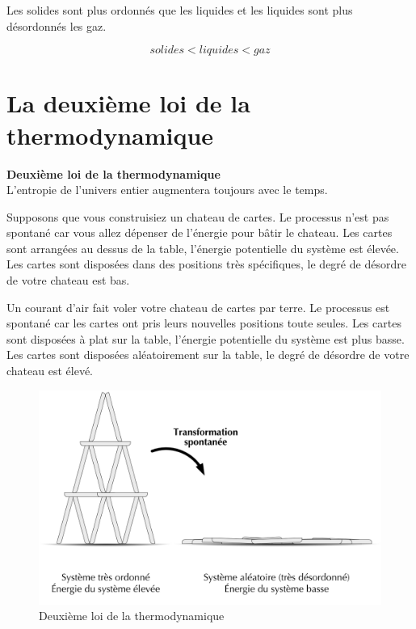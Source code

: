 \documentclass[
  11pt,
  a4paper,
  openany]{book}
\begin{document}
\begin{Answer}
Les solides sont plus ordonnés que les liquides et les liquides sont plus désordonnés les gaz.

\[
solides < liquides < gaz
\]

\end{Answer}

\hypertarget{la-deuxiuxe8me-loi-de-la-thermodynamique}{%
\section{La deuxième loi de la thermodynamique}\label{la-deuxiuxe8me-loi-de-la-thermodynamique}}

\begin{tcolorbox}
\textbf{Deuxième loi de la thermodynamique}\\
L'entropie de l'univers entier augmentera toujours avec le temps.

\end{tcolorbox}

Supposons que vous construisiez un chateau de cartes. Le processus n'est pas spontané car vous allez dépenser de l'énergie pour bâtir le chateau. Les cartes sont arrangées au dessus de la table, l'énergie potentielle du système est élevée. Les cartes sont disposées dans des positions très spécifiques, le degré de désordre de votre chateau est bas.

Un courant d'air fait voler votre chateau de cartes par terre. Le processus est spontané car les cartes ont pris leurs nouvelles positions toute seules. Les cartes sont disposées à plat sur la table, l'énergie potentielle du système est plus basse. Les cartes sont disposées aléatoirement sur la table, le degré de désordre de votre chateau est élevé.

\clearpage

\begin{figure}

{\centering \includegraphics[width=0.4\linewidth]{images/cards-castle} 

}

\caption{Deuxième loi de la thermodynamique}\label{fig:cards-castle}
\end{figure}
\end{document}
